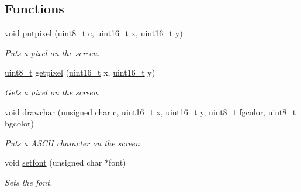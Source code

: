 \subsection*{Functions}
\begin{DoxyCompactItemize}
\item 
void \hyperlink{a00059_ab17a69b465efb1ebe54a6a2e5d7b7ce8_ab17a69b465efb1ebe54a6a2e5d7b7ce8}{putpixel} (\hyperlink{a00134_aba7bc1797add20fe3efdf37ced1182c5_aba7bc1797add20fe3efdf37ced1182c5}{uint8\+\_\+t} c, \hyperlink{a00134_a273cf69d639a59973b6019625df33e30_a273cf69d639a59973b6019625df33e30}{uint16\+\_\+t} x, \hyperlink{a00134_a273cf69d639a59973b6019625df33e30_a273cf69d639a59973b6019625df33e30}{uint16\+\_\+t} y)
\begin{DoxyCompactList}\small\item\em Puts a pixel on the screen. \end{DoxyCompactList}\item 
\hyperlink{a00134_aba7bc1797add20fe3efdf37ced1182c5_aba7bc1797add20fe3efdf37ced1182c5}{uint8\+\_\+t} \hyperlink{a00059_aac0685da0bbf1115c2b76b0aedf7e1f0_aac0685da0bbf1115c2b76b0aedf7e1f0}{getpixel} (\hyperlink{a00134_a273cf69d639a59973b6019625df33e30_a273cf69d639a59973b6019625df33e30}{uint16\+\_\+t} x, \hyperlink{a00134_a273cf69d639a59973b6019625df33e30_a273cf69d639a59973b6019625df33e30}{uint16\+\_\+t} y)
\begin{DoxyCompactList}\small\item\em Gets a pixel on the screen. \end{DoxyCompactList}\item 
void \hyperlink{a00059_a2c8df7a20b47341b70d97a7ff21d86ea_a2c8df7a20b47341b70d97a7ff21d86ea}{drawchar} (unsigned char c, \hyperlink{a00134_a273cf69d639a59973b6019625df33e30_a273cf69d639a59973b6019625df33e30}{uint16\+\_\+t} x, \hyperlink{a00134_a273cf69d639a59973b6019625df33e30_a273cf69d639a59973b6019625df33e30}{uint16\+\_\+t} y, \hyperlink{a00134_aba7bc1797add20fe3efdf37ced1182c5_aba7bc1797add20fe3efdf37ced1182c5}{uint8\+\_\+t} fgcolor, \hyperlink{a00134_aba7bc1797add20fe3efdf37ced1182c5_aba7bc1797add20fe3efdf37ced1182c5}{uint8\+\_\+t} bgcolor)
\begin{DoxyCompactList}\small\item\em Puts a A\+S\+C\+II character on the screen. \end{DoxyCompactList}\item 
void \hyperlink{a00059_abb01dc16ea34f0a6de3d10d732b6c536_abb01dc16ea34f0a6de3d10d732b6c536}{setfont} (unsigned char $\ast$font)
\begin{DoxyCompactList}\small\item\em Sets the font. \end{DoxyCompactList}\end{DoxyCompactItemize}
